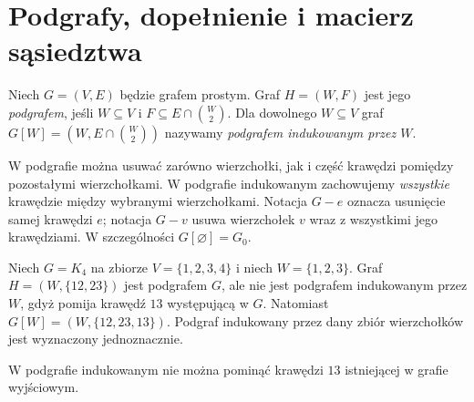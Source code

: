 \section{Podgrafy, dopełnienie i macierz sąsiedztwa}
\label{sec:tg-podgrafy}

\begin{definicja}
Niech $G=(V,E)$ będzie grafem prostym. Graf
$H=(W,F)$ jest jego \emph{podgrafem}, jeśli
$W\subseteq V$ i $F\subseteq E\cap\binom W2$.
Dla dowolnego $W\subseteq V$ graf
$G[W]=(W,E\cap\binom W2)$ nazywamy
\emph{podgrafem indukowanym przez $W$}.
\end{definicja}

W podgrafie można usuwać zarówno wierzchołki, jak i część
krawędzi pomiędzy pozostałymi wierzchołkami. W podgrafie
indukowanym zachowujemy \emph{wszystkie} krawędzie między
wybranymi wierzchołkami. Notacja $G-e$ oznacza usunięcie
samej krawędzi $e$; notacja $G-v$ usuwa wierzchołek $v$
wraz z wszystkimi jego krawędziami. W szczególności
$G[\varnothing]=G_0$.

\begin{przyklad}
Niech $G=K_4$ na zbiorze $V=\{1,2,3,4\}$ i niech
$W=\{1,2,3\}$. Graf $H=(W,\{12,23\})$ jest podgrafem $G$,
ale nie jest podgrafem indukowanym przez $W$, gdyż pomija
krawędź $13$ występującą w $G$. Natomiast
$G[W]=(W,\{12,23,13\})$. Podgraf indukowany przez dany
zbiór wierzchołków jest wyznaczony jednoznacznie.
\end{przyklad}

\begin{center}

{\footnotesize W podgrafie indukowanym nie można pominąć
krawędzi $13$ istniejącej w grafie wyjściowym.}
\end{center}

